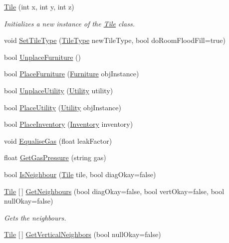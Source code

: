 \begin{DoxyCompactItemize}
\item 
\hyperlink{class_tile_aa35a3149e656433f826c5b4a8c45fd71}{Tile} (int x, int y, int z)
\begin{DoxyCompactList}\small\item\em Initializes a new instance of the \hyperlink{class_tile}{Tile} class. \end{DoxyCompactList}\item 
void \hyperlink{class_tile_a104759fa434ea7c6acc85c81a710a0d9}{Set\+Tile\+Type} (\hyperlink{class_tile_type}{Tile\+Type} new\+Tile\+Type, bool do\+Room\+Flood\+Fill=true)
\item 
bool \hyperlink{class_tile_a47e3946def991a9751ebb485d7f2f28b}{Unplace\+Furniture} ()
\item 
bool \hyperlink{class_tile_ada07c2ba6dd6355e13612b45bfc0c4f0}{Place\+Furniture} (\hyperlink{class_furniture}{Furniture} obj\+Instance)
\item 
bool \hyperlink{class_tile_abfcc2e84347bbb279e288f0d1c995567}{Unplace\+Utility} (\hyperlink{class_utility}{Utility} utility)
\item 
bool \hyperlink{class_tile_a10c975f1ca685654ef1d843210f27b47}{Place\+Utility} (\hyperlink{class_utility}{Utility} obj\+Instance)
\item 
bool \hyperlink{class_tile_af43b05f2ac39247b4aef063995aa3743}{Place\+Inventory} (\hyperlink{class_inventory}{Inventory} inventory)
\item 
void \hyperlink{class_tile_acfb09ae7f8dc543b46f76cef3de2c689}{Equalise\+Gas} (float leak\+Factor)
\item 
float \hyperlink{class_tile_a26292fe76574b5c665fb21bca478a28e}{Get\+Gas\+Pressure} (string gas)
\item 
bool \hyperlink{class_tile_a4f390d0ed829888b1446ec099ab28124}{Is\+Neighbour} (\hyperlink{class_tile}{Tile} tile, bool diag\+Okay=false)
\item 
\hyperlink{class_tile}{Tile} \mbox{[}$\,$\mbox{]} \hyperlink{class_tile_ad4db0caa267514917bafbb228eebd809}{Get\+Neighbours} (bool diag\+Okay=false, bool vert\+Okay=false, bool null\+Okay=false)
\begin{DoxyCompactList}\small\item\em Gets the neighbours. \end{DoxyCompactList}\item 
\hyperlink{class_tile}{Tile} \mbox{[}$\,$\mbox{]} \hyperlink{class_tile_aa6677ae6cb5d9d6bb4c5e73f18889454}{Get\+Vertical\+Neighbors} (bool null\+Okay=false)

\end{DoxyCompactItemize}
